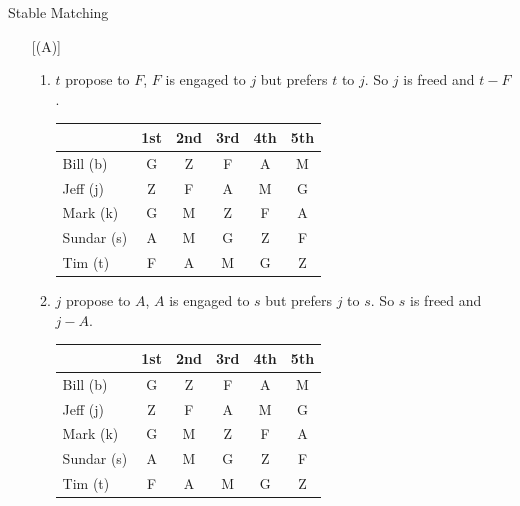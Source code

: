 \documentclass{article}
\numberwithin{table}{section}
\numberwithin{figure}{section}
\begin{document}
\begin{section}{Stable Matching}
\begin{enumerate} [(A)]
\begin{enumerate}[(1)]
\begin{tcolorbox}[breakable]
\begin{enumerate}[(1)]
                    \item $t$ propose to $F$, $F$ is engaged to $j$ but prefers $t$ to $j$. So $j$ is freed and $t-F$.
                    \begin{table}[H]
                        \centering
                        \begin{tabular}{|m{2.5cm}|*{5}{c|}}
                            \hline
                            & 1st & 2nd & 3rd & 4th & 5th \\
                            \hline
                            Bill (b)        & {\color{blue} G} & {\color{red} Z} & F & A & M \\
                            Jeff (j)        & {\color{blue} Z} & {\color{blue} F} & A & M & G \\
                            Mark (k)        & {\color{red} G} & M & Z & F & A \\
                            Sundar (s)      & {\color{red} A} & M & G & Z & F \\
                            Tim (t)         & {\color{red} F} & A & M & G & Z \\
                            \hline                            
                        \end{tabular}
                    \end{table}

                    \item $j$ propose to $A$, $A$ is engaged to $s$ but prefers $j$ to $s$. So $s$ is freed and $j-A$.
                    \begin{table}[H]
                        \centering
                        \begin{tabular}{|m{2.5cm}|*{5}{c|}}
                            \hline
                            & 1st & 2nd & 3rd & 4th & 5th \\
                            \hline
                            Bill (b)        & {\color{blue} G} & {\color{red} Z} & F & A & M \\
                            Jeff (j)        & {\color{blue} Z} & {\color{blue} F} & {\color{red} A} & M & G \\
                            Mark (k)        & {\color{red} G} & M & Z & F & A \\
                            Sundar (s)      & {\color{blue} A} & M & G & Z & F \\
                            Tim (t)         & {\color{red} F} & A & M & G & Z \\
                            \hline                            
                        \end{tabular}
                    \end{table}


\end{enumerate}
\end{tcolorbox}
\end{enumerate}
\end{enumerate}
\end{section}
\end{document}
